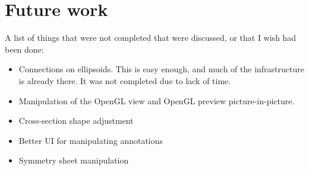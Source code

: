 \section{Future work}
A list of things that were not completed that were discussed, or that I wish had
been done:
\begin{itemize}
\item Connections on ellipsoids. This is easy enough, and much of the
infrastructure is already there. It was not completed due to lack of time.
\item Manipulation of the OpenGL view and OpenGL preview picture-in-picture.
\item Cross-section shape adjustment
\item Better UI for manipulating annotations
\item Symmetry sheet manipulation
\end{itemize}

